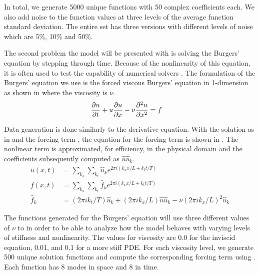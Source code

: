 \documentclass[preprint,12pt,times,authoryear]{elsarticle}
\begin{document}
In total, we generate \num{5000} unique functions with \num{50} complex coefficients each. We also add noise to the function values at three levels of the average function standard deviation. The entire set has three versions with different levels of noise which are 5\%, 10\% and 50\%.

The second problem the model will be presented with is solving the Burgers' equation by stepping through time. Because of the nonlinearity of this equation, it is often used to test the capability of numerical solvers \citep{woodExactSolutionBurgers2006,wazwazPartialDifferentialEquations2010,koprivaImplementingSpectralMethods2009}. The formulation of the Burgers' equation we use is the forced viscous Burgers' equation in 1-dimension as shown in  where the viscosity is \(\nu{}\).
\begin{align}
  \pdv{u}{t}+u\pdv{u}{x}-\nu\pdv[2]{u}{x} & = f \label{eq:forced_viscous_burgers}
\end{align}

Data generation is done similarly to the derivative equation. With the solution as in  and the forcing term , the equation for the forcing term is shown in . The nonlinear term is approximated, for efficiency, in the physical domain and the coefficients subsequently computed as \(\hat{uu}_k\).
\begin{align}
  u\left(x, t \right) & = \sum_{k_{x}} \sum_{k_{t}} \hat{u}_k e^{2\pi i(k_{x}x/L+k_{t}t/T)} \label{eq:fourier_field}                                         \\
  f\left(x, t \right) & = \sum_{k_{x}}\sum_{k_{t}} \hat{f}_k e^{2\pi i(k_{x}x/L+k_{t}t/T)} \label{eq:fourier_force}                                          \\
  \hat{f}_k           & = (2\pi i k_{t}/T) \hat{u}_k + (2\pi i k_{x}/L)\hat{uu}_k - \nu{(2\pi i k_{x}/L)}^2\hat{u}_k \label{eq:forced_viscous_burgers_coeff}
\end{align}

The functions generated for the Burgers' equation will use three different values of \(\nu{}\) to in order to be able to analyze how the model behaves with varying levels of stiffness and nonlinearity. The values for viscosity are \num{0.0} for the inviscid equation, \num{0.01}, and \num{0.1} for a more stiff PDE\@. For each viscosity level, we generate \num{500} unique solution functions and compute the corresponding forcing term using . Each function has 8 modes in space and 8 in time.
\end{document}
